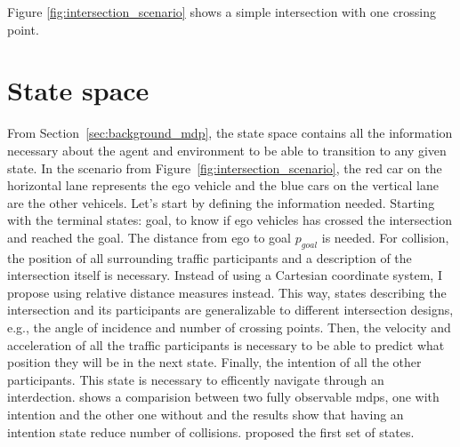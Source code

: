 Figure \ref{fig:intersection_scenario} shows a simple intersection with one crossing point. 



\section{State space}
From Section~\ref{sec:background_mdp}, the state space contains all the information necessary about the agent and environment to be able to transition to any given state. In the scenario from Figure~\ref{fig:intersection_scenario}, the red car on the horizontal lane represents the ego vehicle and the blue cars on the vertical lane are the other vehicels. 
Let's start by defining the information needed. Starting with the terminal states: goal, to know if ego vehicles has crossed the intersection and reached the goal. The distance from ego to goal $p_{goal}$ is needed. For collision, the position of all surrounding traffic participants and a description of the intersection itself is necessary. Instead of using a Cartesian coordinate system, I propose using relative distance measures instead. This way, states describing the intersection and its participants are generalizable to different intersection designs, e.g., the angle of incidence and number of crossing points. 
Then, the velocity and acceleration of all the traffic participants is necessary to be able to predict what position they will be in the next state. Finally, the intention of all the other participants. This state is necessary to efficently navigate through an interdection. \paperBelief shows a comparision between two fully observable \gls{mdp}s, one with intention and the other one without and the results show that having an intention state reduce number of collisions. 
\paperLSTM proposed the first set of states. %

